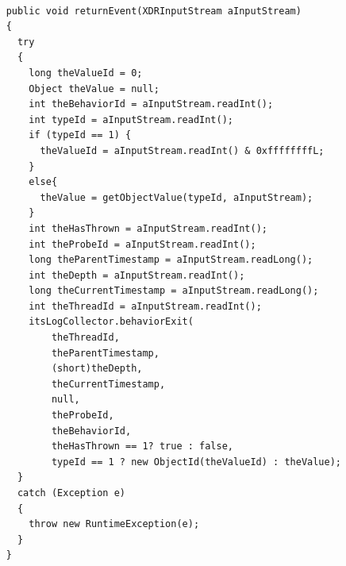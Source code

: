 \documentclass[12pt,legalpaper]{report}
\begin{document}
\begin{singlespace}
\begin{lstlisting}
		
    public void returnEvent(XDRInputStream aInputStream)
    {
      try
      {
        long theValueId = 0;
        Object theValue = null;
        int theBehaviorId = aInputStream.readInt();
        int typeId = aInputStream.readInt();
        if (typeId == 1) {
          theValueId = aInputStream.readInt() & 0xffffffffL;
        }
        else{
          theValue = getObjectValue(typeId, aInputStream);					
        }
        int theHasThrown = aInputStream.readInt();
        int theProbeId = aInputStream.readInt();
        long theParentTimestamp = aInputStream.readLong();
        int theDepth = aInputStream.readInt();
        long theCurrentTimestamp = aInputStream.readLong();
        int theThreadId = aInputStream.readInt();
        itsLogCollector.behaviorExit(
            theThreadId, 
            theParentTimestamp, 
            (short)theDepth, 
            theCurrentTimestamp, 
            null,
            theProbeId, 
            theBehaviorId,
            theHasThrown == 1? true : false,
            typeId == 1 ? new ObjectId(theValueId) : theValue);
      }
      catch (Exception e)
      {
        throw new RuntimeException(e);
      }
    }


\end{lstlisting}
\end{singlespace}
\end{document}
